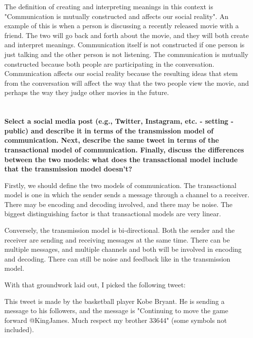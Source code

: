 \documentclass[a4paper]{article}
\begin{document}
        The definition of creating and interpreting meanings in this context is "Communication is mutually constructed and affects our 
        social reality". An example of this is when a person is discussing a recently released movie with a friend. The two will 
        go back and forth about the movie, and they will both create and interpret meanings. Communication itself is not 
        constructed if one person is just talking and the other person is not listening. The communication is mutually constructed
        because both people are participating in the conversation. Communication affects our social reality because the
        resulting ideas that stem from the conversation will affect the way that the two people view the movie, and 
        perhaps the way they judge other movies in the future.

  
    \section{}
        \textbf{Select a social media post (e.g., Twitter, Instagram, etc. - setting - public) and describe it in terms of the transmission model of communication. Next, describe the same tweet in terms of the transactional model of communication. Finally, discuss the differences between the two models: what does the transactional model include that the transmission model doesn’t?}

        Firstly, we should define the two models of communication. The transactional model is one in which the sender sends a message
        through a channel to a receiver. There may be encoding and decoding involved, and there may be noise. The biggest 
        distinguishing factor is that transactional models are very linear. 

        Conversely, the transmission model is bi-directional. Both the sender and the receiver are sending and receiving messages
        at the same time. There can be multiple messages, and multiple channels and both will be involved in encoding and decoding.
        There can still be noise and feedback like in the transmission model. 

        With that groundwork laid out, I picked the following tweet: \cite{kobeTweet}

        This tweet is made by the basketball player Kobe Bryant. He is sending a message to his followers, and the message is
        "Continuing to move the game forward @KingJames. Much respect my brother 33644" (some symbols not included). 
        
\end{document}
